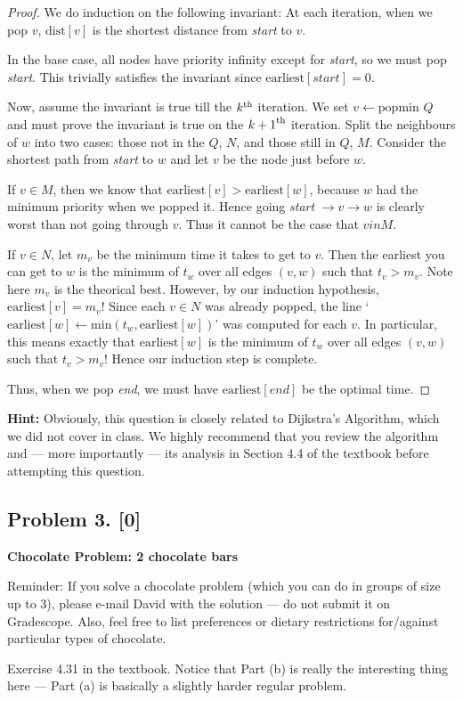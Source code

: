 \documentclass[10pt]{article}
\providecommand{\Kth}[1]{\ensuremath{{#1}^{\rm th}}}
\begin{document}
\begin{proof}
  We do induction on the following invariant: At each iteration, when we pop \(v\), \(\text{dist}[v]\) is the shortest distance from \textit{start} to \(v\).

  In the base case, all nodes have priority infinity except for \textit{start}, so we must pop \textit{start}. This trivially satisfies the invariant since \(\text{earliest}[\textit{start}] = 0\).

  Now, assume the invariant is true till the \Kth{k} iteration. We set \(v \gets \text{popmin } Q\) and must prove the invariant is true on the \Kth{k + 1} iteration. Split the neighbours of \(w\) into two cases: those not in the \(Q\), \(N\), and those still in \(Q\), \(M\). Consider the shortest path from \textit{start} to \(w\) and let \(v\) be the node just before \(w\). 

  If \(v \in M\), then we know that \(\text{earliest}[v] > \text{earliest}[w]\), because \(w\) had the minimum priority when we popped it. Hence going \textit{start} \(\to v \to w\) is clearly worst than not going through \(v\). Thus it cannot be the case that \(v in M\). 

  If \(v \in N\), let \(m_v\) be the minimum time it takes to get to \(v\). Then the earliest you can get to \(w\) is the minimum of \(t_w\) over all edges \((v, w)\) such that \(t_v > m_v\). Note here \(m_v\) is the theorical best. However, by our induction hypothesis, \(\text{earliest}[v] = m_v\)! Since each \(v \in N\) was already popped, the line `\(\text{earliest}[w] \gets \text{min}(t_w, \text{earliest}[w])\)' was computed for each \(v\). In particular, this means exactly that \(\text{earliest}[w]\) is the minimum of \(t_w\) over all edges \((v, w)\) such that \(t_v > m_v\)! Hence our induction step is complete. 

  Thus, when we pop \textit{end}, we must have \(\text{earliest}[\textit{end}]\) be the optimal time. 


\end{proof}

\noindent \textbf{Hint:} Obviously, this question is closely related to Dijkstra's Algorithm, which we did not cover in class. We highly recommend that you review the algorithm and --- more importantly --- its analysis in Section 4.4 of the textbook before attempting this question.


\subsection*{Problem 3. [0]}
\textbf{Chocolate Problem: 2 chocolate bars}

Reminder: If you solve a chocolate problem (which you can do in groups of size up to 3), please e-mail David with the solution --- do not submit it on Gradescope. Also, feel free to list preferences or dietary restrictions for/against particular types of chocolate.

Exercise 4.31 in the textbook. Notice that Part (b) is really the interesting thing here --- Part (a) is basically a slightly harder regular problem.
\end{document}
